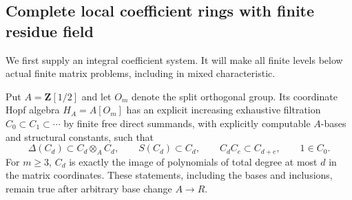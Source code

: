 \subsection{Complete local coefficient rings with finite residue field}
\label{C:complete-finite-residue-subsection}

We first supply an integral coefficient system. It will make
all finite levels below actual finite matrix problems, including
in mixed characteristic.

\begin{lemma}
\label{C:integral-orthogonal-coalgebras}
Put $A=\mathbf Z[1/2]$ and let $O_m$ denote the split
orthogonal group. Its coordinate Hopf algebra $H_A=A[O_m]$
has an explicit increasing exhaustive filtration
$C_0\subset C_1\subset\cdots$ by finite free direct summands,
with explicitly computable $A$-bases and structural constants,
such that
\[
 \Delta(C_d)\subset C_d\otimes_A C_d,\qquad
 S(C_d)\subset C_d,\qquad
 C_d C_e\subset C_{d+e},\qquad 1\in C_0.              \tag{C.3.CR1}
\]
For $m\geq3$, $C_d$ is exactly the image of polynomials of
total degree at most $d$ in the matrix coordinates.
These statements, including the bases and inclusions,
remain true after arbitrary base change $A\to R$.
\end{lemma}
